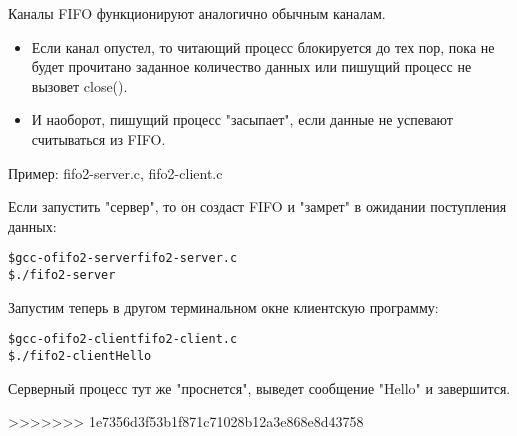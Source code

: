 \documentclass{beamer}
\begin{document}
\begin{frame}[fragile]
Каналы FIFO функционируют аналогично обычным каналам.
\begin{itemize}
\item Если канал опустел, то читающий процесс блокируется до тех пор, пока не будет прочитано заданное количество данных или пишущий процесс не вызовет close().
\item И наоборот, пишущий процесс "засыпает", если данные не успевают считываться из FIFO.
\end{itemize}
Пример: fifo2-server.c, fifo2-client.c 

Если запустить "сервер", то он создаст FIFO и "замрет" в ожидании поступления данных:
\begin{alltt}
\$ gcc -o fifo2-server fifo2-server.c
\$ ./fifo2-server
\end{alltt}
Запустим теперь в другом терминальном окне клиентскую программу:
\begin{alltt}
\$ gcc -o fifo2-client fifo2-client.c
\$ ./fifo2-client Hello
\end{alltt}
Серверный процесс тут же "проснется", выведет сообщение "Hello" и завершится.
\end{frame}

>>>>>>> 1e7356d3f53b1f871c71028b12a3e868e8d43758
\end{document}
